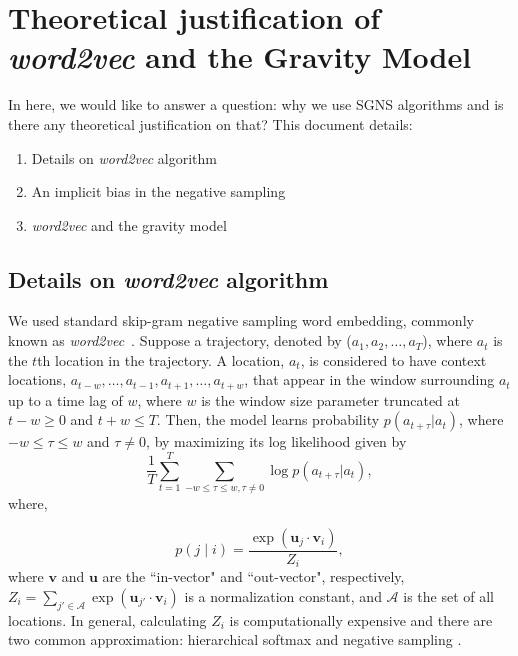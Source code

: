 \documentclass[12pt,a4paper]{article}
\def\given{\mid}
\begin{document}
\section{Theoretical justification of \textit{word2vec} and the Gravity Model} 
In here, we would like to answer a question: why we use SGNS algorithms and is there any theoretical justification on that? This document details:
\begin{enumerate}
	\item Details on \textit{word2vec} algorithm
	\item An implicit bias in the negative sampling
	\item \textit{word2vec} and the gravity model
	
\end{enumerate}

\subsection{Details on \textit{word2vec} algorithm}
We used standard skip-gram negative sampling word embedding, commonly known as \textit{word2vec}~\autocite{mikolov2013word2vec}.
Suppose a trajectory, denoted by ($a_{1}, a_{2}, \ldots, a_{T}$), where $a_{t}$ is the $t$th location in the trajectory. A location, $a_{t}$, is considered to have context locations, $a_{t-w}, \ldots, a_{t-1}, a_{t+1},\ldots, a_{t+w}$, that appear in the window surrounding $a_t$ up to a time lag of $w$, where $w$ is the window size parameter truncated at $t - w \geq 0$ and $t + w \leq T$. Then, the model learns probability $p(a_{t + \tau} \vert a_{t})$, where $-w\leq \tau\leq w$ and $\tau \neq 0$,  by maximizing its log likelihood given by
%
%
\begin{equation}
	\frac{1}{T}\sum_{t = 1}^{T} \sum_{-w \leq \tau \leq w, \tau \neq 0} \log p(a_{t + \tau} \vert a_{t}),
\end{equation}
where,

%
%
\begin{equation}
	p(j \given i) = \frac{\exp(\bm{u}_j \cdot \bm{v}_{i})}{Z_i}, \label{eq:cond_prob_w2v}
\end{equation}
where $\bm{v}$ and $\bm{u}$ are the ``in-vector" and ``out-vector", respectively,  $Z_i=\sum_{j' \in \mathcal{A}} \exp(\bm{u}_{j'} \cdot \bm{v}_{i})$ is a normalization constant, and $\mathcal{A}$ is the set of all locations. In general, calculating $Z_i$ is computationally expensive and there are two common approximation: 
 hierarchical softmax \autocite{morin2005hierarchical} and negative sampling \autocite{mikolov2013word2vec}.
\end{document}
